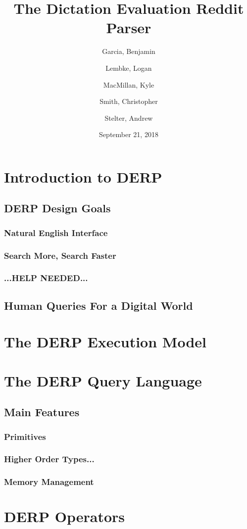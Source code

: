\documentclass{article}
\title{The Dictation Evaluation Reddit Parser}
\author{
Garcia, Benjamin \and
Lembke, Logan \and 
MacMillan, Kyle  \and 
Smith, Christopher \and 
Stelter, Andrew 
}
\date{September 21, 2018}
\begin{document}
\maketitle

\section{Introduction to DERP}
\subsection{DERP Design Goals}
\subsubsection{Natural English Interface}
\subsubsection{Search More, Search Faster}
\subsubsection{...HELP NEEDED...}
\subsection{Human Queries For a Digital World}
\section{The DERP Execution Model}

\section{The DERP Query Language}
\subsection{Main Features}
\subsubsection{Primitives}
\subsubsection{Higher Order Types...}
\subsubsection{Memory Management}

\section{DERP Operators}
\end{document}
